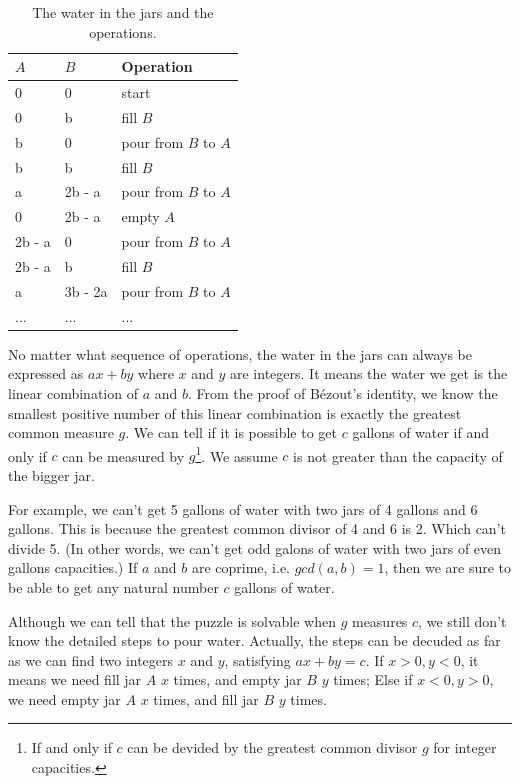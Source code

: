 \documentclass{article}
\begin{document}
\begin{table}[htbp]
\centering
\begin{tabular}{l|l|l}
$A$ & $B$ & Operation \\
\hline
0 & 0 & start \\
0 & b & fill $B$ \\
b & 0 & pour from $B$ to $A$ \\
b & b & fill $B$ \\
a & 2b - a & pour from $B$ to $A$ \\
0 & 2b - a & empty $A$ \\
2b - a & 0 & pour from $B$ to $A$ \\
2b - a & b & fill $B$ \\
a & 3b - 2a & pour from $B$ to $A$ \\
... & ... & ... \\
\end{tabular}
\caption{The water in the jars and the operations.} \label{tab:jug-ops}
\end{table}

No matter what sequence of operations, the water in the jars can always be expressed as $ax + by$ where $x$ and $y$ are integers. It means the water we get is the linear combination of $a$ and $b$. From the proof of Bézout's identity, we know the smallest positive number of this linear combination is exactly the greatest common measure $g$. We can tell if it is possible to get $c$ gallons of water if and only if $c$ can be measured by $g$\footnote{If and only if $c$ can be devided by the greatest common divisor $g$ for integer capacities.}. We assume $c$ is not greater than the capacity of the bigger jar.

For example, we can't get 5 gallons of water with two jars of 4 gallons and 6 gallons. This is because the greatest common divisor of 4 and 6 is 2. Which can't divide 5. (In other words, we can't get odd galons of water with two jars of even gallons capacities.) If $a$ and $b$ are coprime, i.e. $gcd(a, b) = 1$, then we are sure to be able to get any natural number $c$ gallons of water.

Although we can tell that the puzzle is solvable when $g$ measures $c$, we still don't know the detailed steps to pour water. Actually, the steps can be decuded as far as we can find two integers $x$ and $y$, satisfying $ax + by = c$. If $x > 0, y < 0$, it means we need fill jar $A$ $x$ times, and empty jar $B$ $y$ times; Else if $x < 0, y > 0$, we need empty jar $A$ $x$ times, and fill jar $B$ $y$ times.
\end{document}

